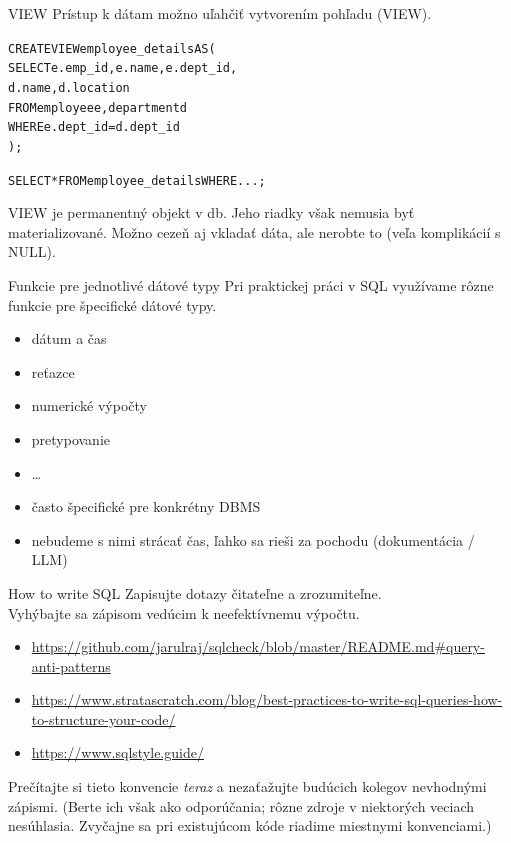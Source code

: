 \documentclass[12pt]{beamer}
\def\blue#1{\textcolor{Cerulean}{#1}}
\begin{document}
\begin{frame}[fragile]{VIEW}
Prístup k dátam možno uľahčiť vytvorením pohľadu (VIEW).
\begin{alltt}
\alert{CREATE VIEW} \blue{employee_details} AS (
    SELECT e.emp_id, e.name, e.dept_id,
           d.name, d.location
    FROM employee e, department d
    WHERE e.dept_id = d.dept_id
);

SELECT * FROM \blue{employee_details} WHERE ...;
\end{alltt}
VIEW je permanentný objekt v db. Jeho riadky však nemusia byť materializované.
Možno cezeň aj vkladať dáta, ale nerobte to (veľa komplikácií s NULL).
\end{frame}


\begin{frame}[fragile]{Funkcie pre jednotlivé dátové typy}
Pri praktickej práci v SQL využívame rôzne funkcie pre špecifické dátové typy.
\begin{itemize}
\item dátum a čas
\item reťazce
\item numerické výpočty
\item pretypovanie
\item \dots
\item často špecifické pre konkrétny DBMS
\item nebudeme s nimi strácať čas, ľahko sa rieši za pochodu (dokumentácia / LLM)
\end{itemize}
\end{frame}


\begin{frame}[fragile]{How to write SQL}
Zapisujte dotazy čitateľne a zrozumiteľne.\\
Vyhýbajte sa zápisom vedúcim k neefektívnemu výpočtu.\\[3mm]
\begin{itemize}
\item {\scriptsize\url{https://github.com/jarulraj/sqlcheck/blob/master/README.md#query-anti-patterns}}
\item {\scriptsize\url{https://www.stratascratch.com/blog/best-practices-to-write-sql-queries-how-to-structure-your-code/}}
\item {\scriptsize\url{https://www.sqlstyle.guide/}}
\end{itemize}
\vspace*{3mm}
Prečítajte si tieto konvencie \emph{teraz} a nezaťažujte budúcich kolegov nevhodnými zápismi.
(Berte ich však ako odporúčania; rôzne zdroje v niektorých veciach nesúhlasia. Zvyčajne sa pri existujúcom kóde riadime miestnymi konvenciami.)
\end{frame}
\end{document}

